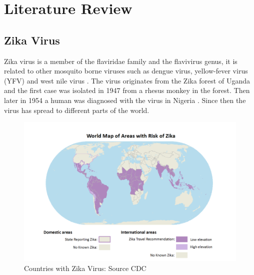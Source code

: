 \chapter{Literature Review}



\section{Zika Virus}
Zika virus is a member of the flaviridae family
and the flavivirus genus,
it is related to other mosquito borne viruses such as dengue virus, yellow-fever  virus (YFV)  and west nile virus \citep{doi}.
The virus originates from the Zika forest of Uganda and the first case was isolated in 1947 from a rhesus monkey in the forest. Then later in 1954 a human was diagnosed with the virus in Nigeria \citep{2015zika}. Since then the virus has spread to different parts of the world. 
\begin{figure}[h!]
\centering
\includegraphics[scale=0.5]{images/map_zika.png} 
\caption{Countries with Zika Virus: Source CDC}\label{fig 1}
\end{figure}



